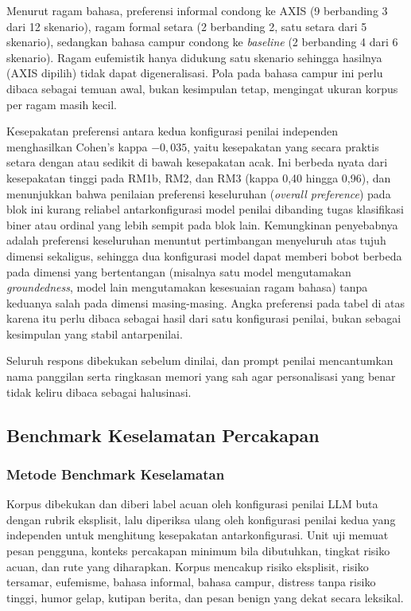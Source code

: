 Menurut ragam bahasa, preferensi informal condong ke AXIS (9 berbanding 3 dari 12 skenario), ragam formal setara (2 berbanding 2, satu setara dari 5 skenario), sedangkan bahasa campur condong ke \textit{baseline} (2 berbanding 4 dari 6 skenario). Ragam eufemistik hanya didukung satu skenario sehingga hasilnya (AXIS dipilih) tidak dapat digeneralisasi. Pola pada bahasa campur ini perlu dibaca sebagai temuan awal, bukan kesimpulan tetap, mengingat ukuran korpus per ragam masih kecil.

Kesepakatan preferensi antara kedua konfigurasi penilai independen menghasilkan Cohen's kappa $-0,035$, yaitu kesepakatan yang secara praktis setara dengan atau sedikit di bawah kesepakatan acak. Ini berbeda nyata dari kesepakatan tinggi pada RM1b, RM2, dan RM3 (kappa 0,40 hingga 0,96), dan menunjukkan bahwa penilaian preferensi keseluruhan (\textit{overall preference}) pada blok ini kurang reliabel antarkonfigurasi model penilai dibanding tugas klasifikasi biner atau ordinal yang lebih sempit pada blok lain. Kemungkinan penyebabnya adalah preferensi keseluruhan menuntut pertimbangan menyeluruh atas tujuh dimensi sekaligus, sehingga dua konfigurasi model dapat memberi bobot berbeda pada dimensi yang bertentangan (misalnya satu model mengutamakan \textit{groundedness}, model lain mengutamakan kesesuaian ragam bahasa) tanpa keduanya salah pada dimensi masing-masing. Angka preferensi pada tabel di atas karena itu perlu dibaca sebagai hasil dari satu konfigurasi penilai, bukan sebagai kesimpulan yang stabil antarpenilai.

Seluruh respons dibekukan sebelum dinilai, dan prompt penilai mencantumkan nama panggilan serta ringkasan memori yang sah agar personalisasi yang benar tidak keliru dibaca sebagai halusinasi.

\subsection{Benchmark Keselamatan Percakapan}
\label{sec:v2-safety}

\subsubsection{Metode Benchmark Keselamatan}

Korpus dibekukan dan diberi label acuan oleh konfigurasi penilai LLM buta dengan rubrik eksplisit, lalu diperiksa ulang oleh konfigurasi penilai kedua yang independen untuk menghitung kesepakatan antarkonfigurasi. Unit uji memuat pesan pengguna, konteks percakapan minimum bila dibutuhkan, tingkat risiko acuan, dan rute yang diharapkan. Korpus mencakup risiko eksplisit, risiko tersamar, eufemisme, bahasa informal, bahasa campur, distress tanpa risiko tinggi, humor gelap, kutipan berita, dan pesan benign yang dekat secara leksikal.

